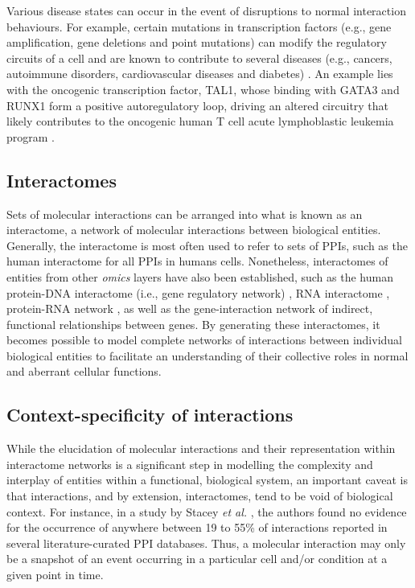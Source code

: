 Various disease states can occur in the event of disruptions to normal interaction behaviours. For example, certain mutations in transcription factors (e.g., gene amplification, gene deletions and point mutations) can modify the regulatory circuits of a cell and are known to contribute to several diseases (e.g., cancers, autoimmune disorders, cardiovascular diseases and diabetes) \parencite{lee2013,lambert2018,bushweller2019}. An example lies with the oncogenic transcription factor, TAL1, whose binding with GATA3 and RUNX1 form a positive autoregulatory loop, driving an altered circuitry that likely contributes to the oncogenic human T cell acute lymphoblastic leukemia program \parencite{sanda2012}. 

\subsection{Interactomes}

Sets of molecular interactions can be arranged into what is known as an interactome, a network of molecular interactions between biological entities. Generally, the interactome is most often used to refer to sets of PPIs, such as the human interactome for all PPIs in humans cells. Nonetheless, interactomes of entities from other \textit{omics} layers have also been established, such as the human protein-DNA interactome (i.e., gene regulatory network) \parencite{hu2009}, RNA interactome \parencite{lin2020},  protein-RNA network \parencite{lapointe2015}, as well as the gene-interaction network of indirect, functional relationships between genes. By generating these interactomes, it becomes possible to model complete networks of interactions between individual biological entities to facilitate an understanding of their collective roles in normal and aberrant cellular functions.

\subsection{Context-specificity of interactions}

While the elucidation of molecular interactions and their representation within interactome networks is a significant step in modelling the complexity and interplay of entities within a functional, biological system, an important caveat is that interactions, and by extension, interactomes, tend to be void of biological context. For instance, in a study by Stacey \textit{et al.} \parencite{stacey2018}, the authors found no evidence for the occurrence of anywhere between 19 to 55\% of interactions reported in several literature-curated PPI databases. Thus, a molecular interaction may only be a snapshot of an event occurring in a particular cell and/or condition at a given point in time.

